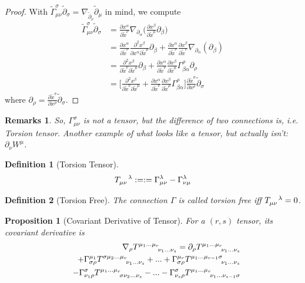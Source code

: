 \documentclass[a4paper]{article}
\newtheorem{remarks}{Remarks}[section]
\theoremstyle{new}
\newtheorem{defi}{Definition}[section]
\newtheorem{prop}{Proposition}[section]
\begin{document}
\begin{proof}
With $\tilde{\Gamma}^\sigma_{\mu\nu}\tilde{\partial}_\sigma=\nabla_{\tilde{\partial}_\nu}\tilde{\partial}_\mu$ in mind, we compute
\begin{align}
    \tilde{\Gamma}^\sigma_{\mu\nu}\tilde{\partial}_\sigma&=\frac{\partial x^\alpha}{\partial\tilde{x}^\nu}\nabla_{\partial_\alpha}\bigg(\frac{\partial x^\beta}{\partial\tilde{x}^\mu}\partial_\beta\bigg)\nonumber\\&=\frac{\partial x^\alpha}{\partial\tilde{x}^\nu}\frac{\partial^2x^\beta}{\partial x^\alpha\partial\tilde{x}^\mu}\partial_\beta+\frac{\partial x^\alpha}{\partial\tilde{x}^\nu}\frac{\partial x^\beta}{\partial\tilde{x}^\nu}\nabla_{\partial_\alpha}(\partial_\beta)\nonumber\\&=\frac{\partial^2x^\beta}{\partial\tilde{x}^\nu\partial\tilde{x}^\mu}\partial_\beta+\frac{\partial x^\alpha}{\partial\tilde{x}^\nu}\frac{\partial x^\beta}{\partial\tilde{x}^\mu}\Gamma_{\beta\alpha}^\rho\partial_\rho\nonumber\\&=\bigg[\frac{\partial^2x^\beta}{\partial\tilde{x}^\nu\partial\tilde{x}^\mu}+\frac{\partial x^\alpha}{\partial\tilde{x}^\nu}\frac{\partial x^\beta}{\partial\tilde{x}^\mu}\Gamma_{\beta\alpha}^\rho\bigg]\frac{\partial\tilde{x}^\sigma}{\partial x^\rho}\tilde{\partial}_\sigma\nonumber
\end{align}
where $\partial_\rho=\frac{\partial\tilde{x}^\sigma}{\partial x^\rho}\tilde{\partial}_\sigma$.
\end{proof}
\begin{remarks}
So, $\Gamma_{\mu\nu}^\sigma$ is not a tensor, but the difference of two connections is, i.e. Torsion tensor. Another example of what looks like a tensor, but actually isn't: $\partial_\nu W^\mu$. 
\end{remarks}
\begin{defi}[Torsion Tensor]
$$\tensor*{T}{*^{}_{\mu\nu}^{\lambda}}:=:=\Gamma_{\mu\nu}^\lambda-\Gamma_{\nu\mu}^\lambda$$
\end{defi}
\begin{defi}[Torsion Free]
The connection $\Gamma$ is called torsion free iff $\tensor*{T}{*^{}_{\mu\nu}^{\lambda}}=0$.
\end{defi}
\begin{prop}[Covariant Derivative of Tensor]
For a $(r,s)$ tensor, its covariant derivative is
\begin{eqnarray}
&&\nabla_\rho\tensor*{T}{*_{}^{\mu_1...\mu_r}_{\nu_1...\nu_s}}=\partial_\rho\tensor*{T}{*_{}^{\mu_1...\mu_r}_{\nu_1...\nu_s}}\nonumber\\&&+\Gamma^{\mu_1}_{\sigma\rho}\tensor*{T}{*_{}^{\sigma\mu_2...\mu_r}_{\nu_1...\nu_s}}+...+\Gamma_{\sigma\rho}^{\mu_r}\tensor*{T}{*_{}^{\mu_1...\mu_{r-1}\sigma}_{\nu_1...\nu_s}}\nonumber\\&&-\Gamma_{\nu_1\rho}^\sigma \tensor*{T}{*_{}^{\mu_1...\mu_r}_{\sigma\nu_2...\nu_s}}-...-\Gamma_{\nu_s\rho}^\sigma \tensor*{T}{*_{}^{\mu_1...\mu_r}_{\nu_1...\nu_{s-1}\sigma}}\nonumber
\end{eqnarray}
\end{prop}
\end{document}
